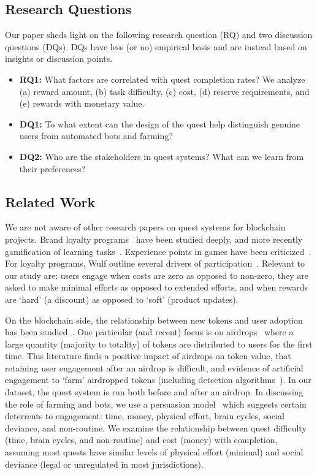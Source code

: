 
\subsection{Research Questions} 
Our paper sheds light on the following research question (RQ) and two discussion questions (DQs). DQs have less (or no) empirical basis and are instead based on insights or discussion points.

\begin{itemize}
\item \textbf{RQ1:} What factors are correlated with quest completion rates? We analyze (a) reward amount, (b) task difficulty, (c) cost, (d) reserve requirements, and (e) rewards with monetary value.
\item \textbf{DQ1:} To what extent can the design of the quest help distinguish genuine users from automated bots and farming?
\item \textbf{DQ2:} Who are the stakeholders in quest systems? What can we learn from their preferences?
\end{itemize}


\subsection{Related Work}

We are not aware of other research papers on quest systems for blockchain projects. Brand loyalty programs~\cite{DU97} have been studied deeply, and more recently gamification of learning tasks~\cite{HKS14}. Experience points in games have been criticized~\cite{Bog13}. For loyalty programs, Wulf \etal outline several drivers of participation~\cite{Wulf03}. Relevant to our study are: users engage when costs are zero as opposed to non-zero, they are asked to make minimal efforts as opposed to extended efforts, and when rewards are `hard' (\eg a discount) as opposed to `soft' (\eg product updates). 

On the blockchain side, the relationship between new tokens and user adoption has been studied~\cite{BH19}. One particular (and recent) focus is on airdrops~\cite{FB19,MYL24,YL24} where a large quantity (majority to totality) of tokens are distributed to users for the first time. This literature finds a positive impact of airdrops on token value, that retaining user engagement after an airdrop is difficult, and evidence of artificial engagement to `farm' airdropped tokens (including detection algorithms~\cite{FTWC23,ZCH+24}). In our dataset, the quest system is run both before and after an airdrop. In discussing the role of farming and bots, we use a persuasion model~\cite{Fogg09} which suggests certain deterrents to engagement: time, money, physical effort, brain cycles, social deviance, and non-routine. We examine the relationship between quest difficulty (time, brain cycles, and non-routine) and cost (money) with completion, assuming most quests have similar levels of physical effort (minimal) and social deviance (legal or unregulated in most jurisdictions). 

